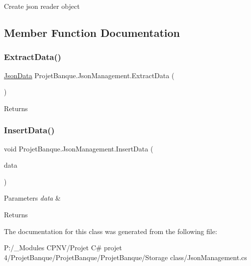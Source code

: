 Create json reader object 



\subsection{Member Function Documentation}
\mbox{\label{class_projet_banque_1_1_json_management_a652a9eb08a2f0a52d6c5b43471ca2944}} 
\subsubsection{\texorpdfstring{ExtractData()}{ExtractData()}}
{\footnotesize\ttfamily \mbox{\hyperlink{class_projet_banque_1_1_json_data}{Json\+Data}} Projet\+Banque.\+Json\+Management.\+Extract\+Data (\begin{DoxyParamCaption}{ }\end{DoxyParamCaption})}





\begin{DoxyReturn}{Returns}

\end{DoxyReturn}
\mbox{\label{class_projet_banque_1_1_json_management_ab7c696c086a0c83cd6e666b40a57e192}} 
\subsubsection{\texorpdfstring{InsertData()}{InsertData()}}
{\footnotesize\ttfamily void Projet\+Banque.\+Json\+Management.\+Insert\+Data (\begin{DoxyParamCaption}\item[{\mbox{\hyperlink{class_projet_banque_1_1_json_data}{Json\+Data}}}]{data }\end{DoxyParamCaption})}






\begin{DoxyParams}{Parameters}
{\em data} & \\
\hline
\end{DoxyParams}
\begin{DoxyReturn}{Returns}

\end{DoxyReturn}


The documentation for this class was generated from the following file\+:\begin{DoxyCompactItemize}
\item 
P\+:/\+\_\+\+Modules C\+P\+N\+V/\+Projet C\# projet 4/\+Projet\+Banque/\+Projet\+Banque/\+Projet\+Banque/\+Storage class/Json\+Management.\+cs\end{DoxyCompactItemize}
